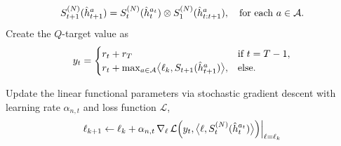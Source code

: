 \documentclass[
    a4paper,
    11pt,
    bibliography=totoc,
    listof=totoc,      
    headinclude=true,
    cleardoublepage=empty,
]{scrbook}
\theoremstyle{plain}
\theoremstyle{definition}
\theoremstyle{remark}
\newcommand{\SpaceA}{{\cal A}}
\begin{document}
\begin{algorithm}
\begin{algorithmic}[1]
\begin{displaymath}
                        S_{t+1}^{(N)}(\hat{h}^a_{t+1}) 
                        = S_t^{(N)}(\hat{h}^{a_t}_{t}) 
                            \otimes S_1^{(N)}(\hat{h}^a_{t:t+1}),
                            \quad \text{for each } a\in\SpaceA.
                    \end{displaymath} 
                    \label{alg:SignatureQLearning:Chen}
                \State 
                    Create the $Q$-target value as
                    \begin{displaymath}
                        y_t = \begin{cases}
                            r_t + r_T & \mbox{if } t = T-1, \\
                            r_t + \max_{a\in\SpaceA} \bigl\langle 
                                \ell_k, S_{t+1}(\hat{h}^a_{t+1}) 
                            \bigr\rangle, & \mbox{else.}
                        \end{cases}
                    \end{displaymath}
                    \label{alg:SignatureQLearning:TargetValue}
                    
                \State Update the linear functional parameters via stochastic
                    gradient descent with learning rate $\alpha_{n,t}$ and loss
                    function $\mathcal{L}$,
                    \[
                        \ell_{k+1} \leftarrow \ell_{k} + \alpha_{n,t}\, \nabla_{\ell}\, \mathcal{L}\Bigl(y_t, \bigl\langle \ell, S_t^{(N)}(\hat{h}^{a_t}_t) \bigr\rangle\Bigr)\Big|_{\ell=\ell_k}
                    \]                    
            \EndFor
		\EndFor
	\end{algorithmic}
\end{algorithm}
\end{document}
